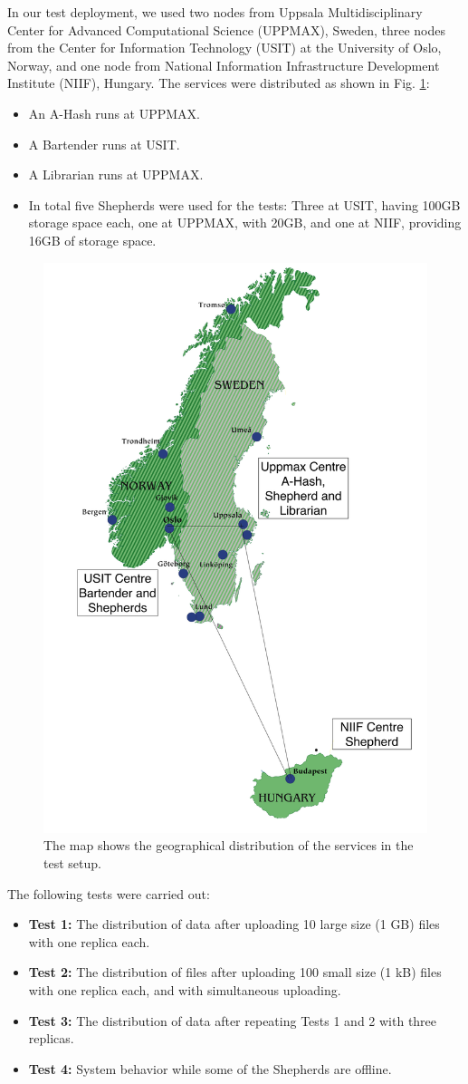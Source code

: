 \documentclass{llncs}
\begin{document}
In our test deployment, we used two nodes from Uppsala
Multidisciplinary Center for Advanced Computational Science (UPPMAX), Sweden, 
three nodes from the Center for Information Technology (USIT) at the
University of Oslo, Norway, 
and one node from National Information Infrastructure Development Institute (NIIF),
Hungary. %
The services were distributed as shown in Fig. \ref{fig:map}:


\begin{itemize}
\item An A-Hash runs at UPPMAX.
\item A Bartender runs at USIT.
\item A Librarian runs at UPPMAX.
\item In total five Shepherds were used for the tests: Three at USIT, having
  100GB storage space each, one at UPPMAX, with 20GB, and one at NIIF, providing 16GB of storage space.
 \end{itemize}

\begin{figure}
\includegraphics[width=0.35\columnwidth]{map}
\caption{The map shows the geographical distribution of the services in the test setup.}
\label{fig:map}
\end{figure}  

The following tests were carried out:
\begin{itemize}
\item \textbf{Test 1:} The distribution of data after uploading 10 large size (1 GB)
  files with one replica each.  
\item \textbf{Test 2:} The distribution of files after uploading 100 small size (1 kB)
  files with one replica each, and with simultaneous uploading.
\item \textbf{Test 3:} The distribution of data after repeating Tests 1 and 2 with three replicas.  
\item \textbf{Test 4:} System behavior while some of the Shepherds are offline.   
\end{itemize}
\end{document}
